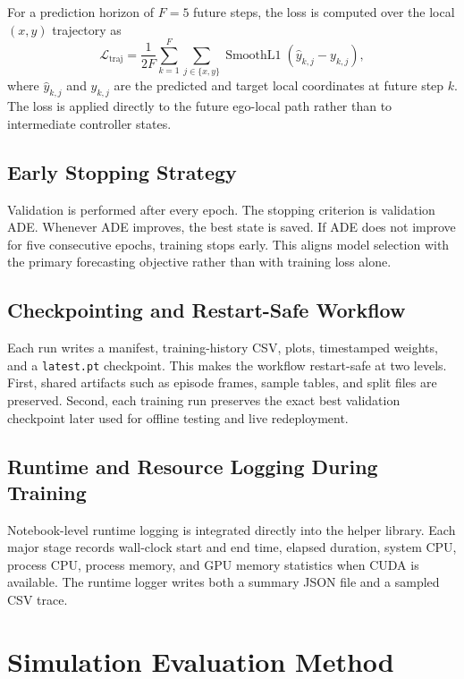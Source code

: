 For a prediction horizon of $F=5$ future steps, the loss is computed over the local $(x,y)$ trajectory as
\[
\mathcal{L}_{\text{traj}} =
\frac{1}{2F}
\sum_{k=1}^{F}
\sum_{j \in \{x,y\}}
\operatorname{SmoothL1}\!\left(\hat{y}_{k,j} - y_{k,j}\right),
\]
where $\hat{y}_{k,j}$ and $y_{k,j}$ are the predicted and target local coordinates at future step $k$. The loss is applied directly to the future ego-local path rather than to intermediate controller states.

\subsection{Early Stopping Strategy}

Validation is performed after every epoch. The stopping criterion is validation ADE. Whenever ADE improves, the best state is saved. If ADE does not improve for five consecutive epochs, training stops early. This aligns model selection with the primary forecasting objective rather than with training loss alone.

\subsection{Checkpointing and Restart-Safe Workflow}

Each run writes a manifest, training-history CSV, plots, timestamped weights, and a \texttt{latest.pt} checkpoint. This makes the workflow restart-safe at two levels. First, shared artifacts such as episode frames, sample tables, and split files are preserved. Second, each training run preserves the exact best validation checkpoint later used for offline testing and live redeployment.

\subsection{Runtime and Resource Logging During Training}

Notebook-level runtime logging is integrated directly into the helper library. Each major stage records wall-clock start and end time, elapsed duration, system CPU, process CPU, process memory, and GPU memory statistics when CUDA is available. The runtime logger writes both a summary JSON file and a sampled CSV trace.

\section{Simulation Evaluation Method}

